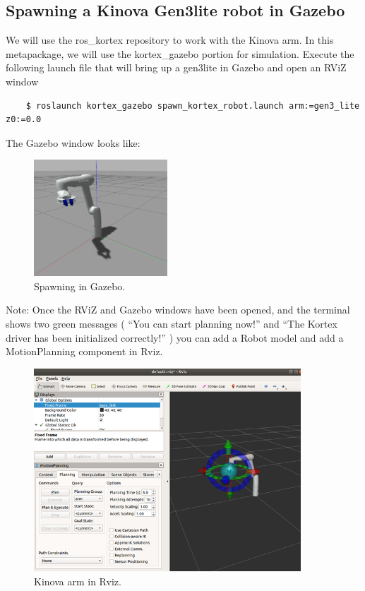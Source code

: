 \documentclass[12pt]{article}
\begin{document}
\subsection{Spawning a Kinova Gen3lite robot in Gazebo}

We will use the ros\_kortex repository to work with the Kinova arm. In this metapackage, we will use the kortex\_gazebo portion for simulation. Execute the following launch file that will bring up a gen3lite in Gazebo and open an RViZ window
\begin{verbatim}
    $ roslaunch kortex_gazebo spawn_kortex_robot.launch arm:=gen3_lite z0:=0.0
    \end{verbatim}

The Gazebo window looks like:

\begin{figure}[H]
    \vspace{-10pt}
    \centering\includegraphics[width=5cm]{images/gazebo.PNG}\vspace{-10pt}
    \caption{Spawning in Gazebo.}\label{fig:gazebo}
    \end{figure}

Note: Once the RViZ and Gazebo windows have been opened, and the terminal shows two green messages ( “You can start planning now!” and “The Kortex driver has been initialized correctly!” ) you can add a Robot model and add a MotionPlanning component in Rviz.

\begin{figure}[H]
    \vspace{-10pt}
    \centering\includegraphics[width=10cm]{images/rviz1.png}\vspace{-10pt}
    \caption{Kinova arm in Rviz.}\label{fig:rviz1}
    \end{figure}
\end{document}
